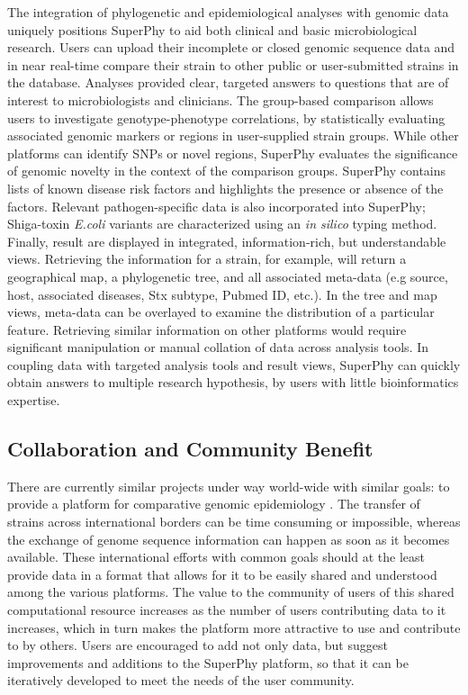 \documentclass[a4paper,twoside]{article}
\begin{document}
The integration of phylogenetic and epidemiological analyses with genomic data uniquely positions SuperPhy to aid both clinical and basic microbiological research. Users can upload their incomplete or closed genomic sequence data and in near real-time compare their strain to other public or user-submitted strains in the database. Analyses provided clear, targeted answers to questions that are of interest to microbiologists and clinicians.  The group-based comparison allows users to investigate genotype-phenotype correlations, by statistically evaluating associated genomic markers or regions in user-supplied strain groups. While other platforms can identify SNPs or novel regions, SuperPhy evaluates the significance of genomic novelty in the context of the comparison groups. SuperPhy contains lists of known disease risk factors and highlights the presence or absence of the factors. Relevant pathogen-specific data is also incorporated into SuperPhy; Shiga-toxin \textit{E.coli} variants are characterized using an \textit{in silico} typing method. Finally, result are displayed in integrated, information-rich, but understandable views. Retrieving the information for a strain, for example, will return a geographical map, a phylogenetic tree, and all associated meta-data (e.g source, host, associated diseases, Stx subtype, Pubmed ID, etc.). In the tree and map views, meta-data can be overlayed to examine the distribution of a particular feature.  Retrieving similar information on other platforms would require significant manipulation or manual collation of data across analysis tools. In coupling data with targeted analysis tools and result views, SuperPhy can quickly obtain answers to multiple research hypothesis, by users with little bioinformatics expertise.

\subsection{Collaboration and Community Benefit}
\label{sec:collaboration}
There are currently similar projects under way world-wide with similar goals: to provide a platform for comparative genomic epidemiology \cite{kupferschmidt_outbreak_2011}. The transfer of strains across international borders can be time consuming or impossible, whereas the exchange of genome sequence information can happen as soon as it becomes available. These international efforts with common goals should at the least provide data in a format that allows for it to be easily shared and understood among the various platforms. The value to the community of users of this shared computational resource increases as the number of users contributing data to it increases, which in turn makes the platform more attractive to use and contribute to by others. Users are encouraged to add not only data, but suggest improvements and additions to the SuperPhy platform, so that it can be iteratively developed to meet the needs of the user community.
\end{document}
